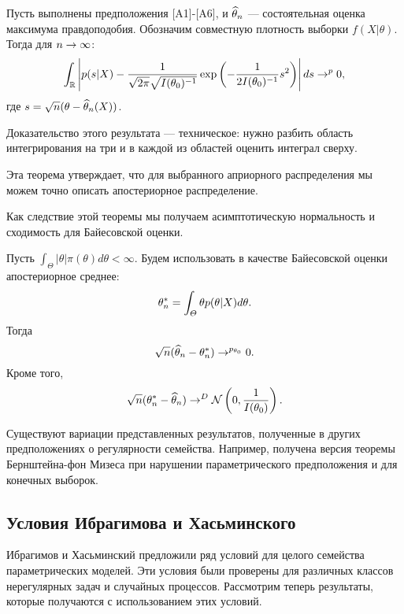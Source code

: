 \begin{Theorem}
Пусть выполнены предположения [A1]-[A6], и $\widehat{\theta}_n$ --- состоятельная оценка максимума правдоподобия.
Обозначим совместную плотность выборки $f(X| \theta)$.
Тогда для $n \rightarrow \infty$:
\[
\int_{\mathbb{R}} \left|p(s | X) - \frac{1}{\sqrt{2\pi}\sqrt{I(\theta_0)^{-1}}} \exp \left(-\frac{1}{2 I(\theta_0)^{-1}} s^2 \right) \right| ds \rightarrow^{p} 0,
\]
где $s = \sqrt{n} (\theta - \widehat{\theta}_n(X))$.
\end{Theorem}

Доказательство этого результата --- техническое: нужно разбить область интегрирования на три и в каждой из областей оценить интеграл сверху.

Эта теорема утверждает, что для выбранного априорного распределения мы можем точно описать апостериорное распределение.

Как следствие этой теоремы мы получаем асимптотическую нормальность и сходимость для Байесовской оценки.
\begin{Theorem}
Пусть $\int_\Theta |\theta| \pi(\theta) d\theta < \infty$. 
Будем использовать в качестве Байесовской оценки апостериорное среднее:
\[
\theta^*_n = \int_{\varTheta} \theta p(\theta | X) d\theta.
\]
Тогда
\[
\sqrt{n} (\widehat{\theta}_n - \theta^*_n) \rightarrow^{p_{\theta_0}} 0.
\]
Кроме того, 
\[
\sqrt{n} (\theta^*_n - \widehat{\theta}_n) \rightarrow^{D} \mathcal{N}\left(0, \frac{1}{I(\theta_0)}\right).
\]
\end{Theorem}

Существуют вариации представленных результатов, полученные в других предположениях о регулярности семейства.
Например, получена версия теоремы Бернштейна-фон Мизеса при нарушении параметрического предположения и для конечных выборок.

\subsection{Условия Ибрагимова и Хасьминского}

Ибрагимов и Хасьминский предложили ряд условий для целого семейства параметрических моделей.
Эти условия были проверены для различных классов нерегулярных задач и случайных процессов.
Рассмотрим теперь результаты, которые получаются с использованием этих условий.

